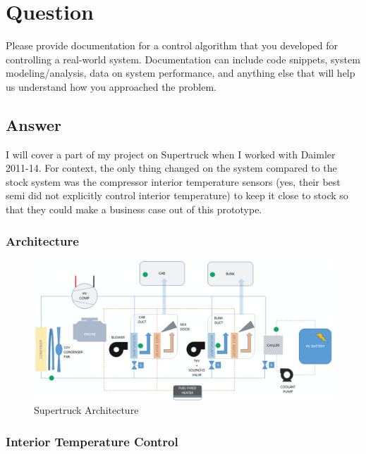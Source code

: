 \section{Question}
Please provide documentation for a control algorithm that you developed for controlling
a real-world system. Documentation can include code snippets, system
modeling/analysis, data on system performance, and anything else that will help us
understand how you approached the problem.

\subsection *{Answer}
I will cover a part of my project on Supertruck when I worked with Daimler 2011-14. For context, the only thing changed on the system compared to the stock system was the compressor interior temperature sensors (yes, their best semi did not explicitly control interior temperature) to keep it close to stock so that they could make a business case out of this prototype.

\subsubsection * {Architecture}

\begin{figure}[h!]
  \includegraphics[width=\textwidth]{supertruck_arch}
  \caption{Supertruck Architecture}
\end{figure}

\subsubsection * {Interior Temperature Control}

